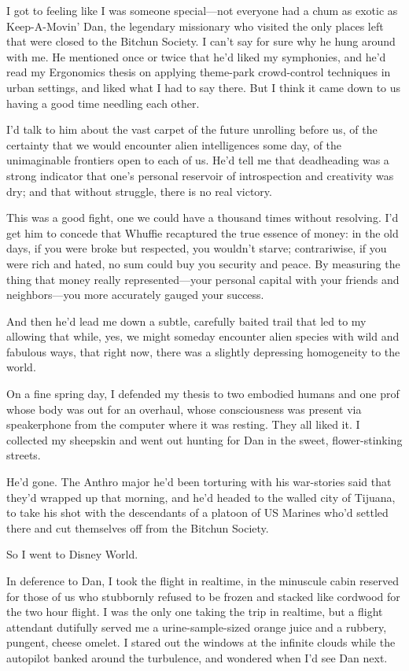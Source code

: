 I got to feeling like I was someone special—not everyone had a chum
as exotic as Keep-A-Movin' Dan, the legendary missionary who
visited the only places left that were closed to the Bitchun
Society. I can't say for sure why he hung around with me. He
mentioned once or twice that he'd liked my symphonies, and he'd
read my Ergonomics thesis on applying theme-park crowd-control
techniques in urban settings, and liked what I had to say there.
But I think it came down to us having a good time needling each
other.

I'd talk to him about the vast carpet of the future unrolling
before us, of the certainty that we would encounter alien
intelligences some day, of the unimaginable frontiers open to each
of us. He'd tell me that deadheading was a strong indicator that
one's personal reservoir of introspection and creativity was dry;
and that without struggle, there is no real victory.

This was a good fight, one we could have a thousand times without
resolving. I'd get him to concede that Whuffie recaptured the true
essence of money: in the old days, if you were broke but respected,
you wouldn't starve; contrariwise, if you were rich and hated, no
sum could buy you security and peace. By measuring the thing that
money really represented—your personal capital with your friends
and neighbors—you more accurately gauged your success.

And then he'd lead me down a subtle, carefully baited trail that
led to my allowing that while, yes, we might someday encounter
alien species with wild and fabulous ways, that right now, there
was a slightly depressing homogeneity to the world.

On a fine spring day, I defended my thesis to two embodied humans
and one prof whose body was out for an overhaul, whose
consciousness was present via speakerphone from the computer where
it was resting. They all liked it. I collected my sheepskin and
went out hunting for Dan in the sweet, flower-stinking streets.

He'd gone. The Anthro major he'd been torturing with his
war-stories said that they'd wrapped up that morning, and he'd
headed to the walled city of Tijuana, to take his shot with the
descendants of a platoon of US Marines who'd settled there and cut
themselves off from the Bitchun Society.

So I went to Disney World.

In deference to Dan, I took the flight in realtime, in the
minuscule cabin reserved for those of us who stubbornly refused to
be frozen and stacked like cordwood for the two hour flight. I was
the only one taking the trip in realtime, but a flight attendant
dutifully served me a urine-sample-sized orange juice and a
rubbery, pungent, cheese omelet. I stared out the windows at the
infinite clouds while the autopilot banked around the turbulence,
and wondered when I'd see Dan next.

